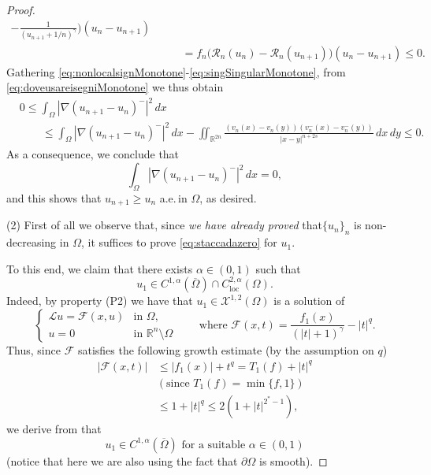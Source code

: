 \documentclass[11pt,a4paper]{amsart}
\def \R {\mathbb{R}}
\def \de {\partial}
\theoremstyle{definition}
\theoremstyle{plain}
\numberwithin{equation}{section}
\begin{document}
{\begin{proof}
\begin{equation}
\begin{split}
			- \frac{1}{(u_{n+1}+1/n)^\gamma}\Big)(u_n-u_{n+1}) \\
			& \qquad = f_n\big(\mathcal{R}_n(u_n)-\mathcal{R}_n(u_{n+1})\big)(u_n-u_{n+1})\leq 0.
		\end{split}
	\end{equation}
	Gathering \eqref{eq:nonlocalsignMonotone}-\eqref{eq:singSingularMonotone}, from
	\eqref{eq:doveusareisegniMonotone} we thus obtain
	\begin{align*}
		& 0\leq \int_{\Omega}|\nabla(u_{n+1}-u_n)^-|^2\,dx \\
		& \qquad
		\leq \int_{\Omega}|\nabla(u_{n+1}-u_n)^-|^2\,dx
		- \iint_{\R^{2n}}\frac{(v_n(x)-v_n(y))(v_n^-(x)-v_n^-(y))}{|x-y|^{n+2s}}\,dx\,dy\leq 0.
	\end{align*}
	As a consequence, we conclude that
	$$\int_{\Omega}|\nabla(u_{n+1}-u_n)^-|^2\,dx  = 0,$$
	and this shows that $u_{n+1}\geq u_n$ a.e.\,in $\Omega$, as desired.
	\medskip
	
	(2)\,\,First of all we observe that, since \emph{we have already proved}
	that$\{u_n\}_n$ is non-de\-cre\-asing in $\Omega$,
	it suffices to prove \eqref{eq:staccadazero} for $u_1$.
	\vspace*{0.05cm}
	
	To this end, we claim that there exists
	$\alpha\in (0,1)$ such that
	\begin{equation} \label{eq:regulu1SMP}
		u_1\in C^{1,\alpha}(\overline{\Omega})\cap C^{2,\alpha}_{\mathrm{loc}}(\Omega).
	\end{equation}
	Indeed, by property (P2) we have that $u_1\in\mathcal{X}^{1,2}(\Omega)$ is a solution of
	$$\begin{cases}
		\mathcal{L} u = \mathcal{F}(x,u) & \text{in $\Omega$}, \\
		u = 0 & \text{in $\R^n\setminus\Omega$}
	\end{cases}\qquad\text{where $\mathcal{F}(x,t) = \frac{f_1(x)}{(|t|+1)^\gamma}-|t|^q$}.$$
	Thus, since
	$\mathcal{F}$ satisfies the following growth estimate (by the assumption on $q$)
	\begin{align*}
		|\mathcal{F}(x,t)|&\leq |f_1(x)|+t^q = T_1(f)+|t|^q\\
		& (\text{since $T_1(f) = \min\{f,1\}$}) \\
		& \leq 1+|t|^q\leq 2(1+|t|^{2^\ast-1}),
	\end{align*}
	we derive from \cite[Theorem 1.3]{SVWZ2} 
	that  
	\begin{equation} \label{eq:u1C1alfa}
		\text{$u_1\in C^{1,\alpha}(\overline{\Omega})$ for a suitable $\alpha\in (0,1)$}
	\end{equation}
	(notice that here we are also using the fact that $\de\Omega$ is smooth).
	

\end{proof}}
\end{document}
